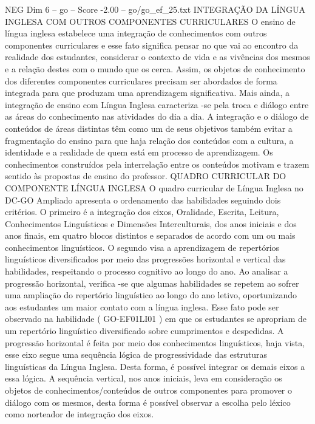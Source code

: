 \begin{textsample}{NEG Dim 6 – go – Score -2.00 – go/go\_ef\_25.txt}  \label{ex:f6_neg_172}
INTEGRAÇÃO DA LÍNGUA INGLESA COM OUTROS COMPONENTES CURRICULARES O ensino de língua inglesa estabelece uma integração de conhecimentos com outros componentes curriculares e esse fato significa pensar no que vai ao encontro da realidade dos estudantes, considerar o contexto de vida e as vivências dos mesmos e a relação destes com o mundo que os cerca.
Assim, os objetos de conhecimento dos diferentes componentes curriculares precisam ser abordados de forma integrada para que produzam uma aprendizagem significativa.
Mais ainda, a integração de ensino com Língua Inglesa caracteriza -se pela troca e diálogo entre as áreas do conhecimento nas atividades do dia a dia.
A integração e o diálogo de conteúdos de áreas distintas têm como um de seus objetivos também evitar a fragmentação do ensino para que haja relação dos conteúdos com a cultura, a identidade e a realidade de quem está em processo de aprendizagem.
Os conhecimentos construídos pela interrelação entre os conteúdos motivam e trazem sentido às propostas de ensino do professor.
QUADRO CURRICULAR DO COMPONENTE LÍNGUA INGLESA O quadro curricular de Língua Inglesa no DC-GO Ampliado apresenta o ordenamento das habilidades seguindo dois critérios.
O primeiro é a integração dos eixos, Oralidade, Escrita, Leitura, Conhecimentos Linguísticos e Dimensões Interculturais, dos anos iniciais e dos anos finais, em quatro blocos distintos e separados de acordo com um ou mais conhecimentos linguísticos.
O segundo visa a aprendizagem de repertórios linguísticos diversificados por meio das progressões horizontal e vertical das habilidades, respeitando o processo cognitivo ao longo do ano.
Ao analisar a progressão horizontal, verifica -se que algumas habilidades se repetem ao sofrer uma ampliação do repertório linguístico ao longo do ano letivo, oportunizando aos estudantes um maior contato com a língua inglesa.
Esse fato pode ser observado na habilidade ( GO-EF01LI01 ) em que os estudantes se apropriam de um repertório linguístico diversificado sobre cumprimentos e despedidas.
A progressão horizontal é feita por meio dos conhecimentos linguísticos, haja vista, esse eixo segue uma sequência lógica de progressividade das estruturas linguísticas da Língua Inglesa.
Desta forma, é possível integrar os demais eixos a essa lógica.
A sequência vertical, nos anos iniciais, leva em consideração os objetos de conhecimentos/conteúdos de outros componentes para promover o diálogo com os mesmos, desta forma é possível observar a escolha pelo léxico como norteador de integração dos eixos.

\end{textsample}
